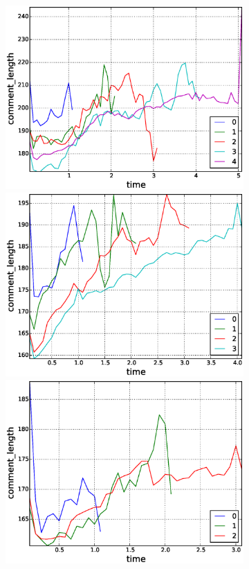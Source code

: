 \begin{figure}[!tb]
\begin{subfigure}{1\textwidth}
    \includegraphics[scale=0.285]{./images/avr_comment_length_for_surviving_year_for_2010.eps}
    \includegraphics[scale=0.285]{./images/avr_comment_length_for_surviving_year_for_2011.eps}
    \includegraphics[scale=0.285]{./images/avr_comment_length_for_surviving_year_for_2012.eps}

\end{subfigure}
\end{figure}
